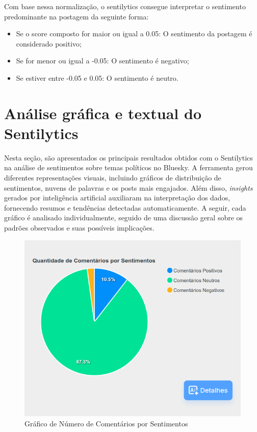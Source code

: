 \documentclass[
	12pt,				%
	oneside,			%
	a4paper,			%
	english,			%
	french,				%
	spanish,			%
	brazil				%
	]{abntex2}
\begin{document}
Com base nessa normalização, o sentilytics consegue interpretar o
sentimento predominante na postagem da seguinte forma:

\begin{itemize}
\tightlist
\item
  Se o score composto for maior ou igual a 0.05: O sentimento da
  postagem é considerado positivo;
\item
  Se for menor ou igual a -0.05: O sentimento é negativo;
\item
  Se estiver entre -0.05 e 0.05: O sentimento é neutro.
\end{itemize}

\hypertarget{anuxe1lise-gruxe1fica-e-textual-do-sentilytics}{%
\section{Análise gráfica e textual do
Sentilytics}\label{anuxe1lise-gruxe1fica-e-textual-do-sentilytics}}

Nesta seção, são apresentados os principais resultados obtidos com o
Sentilytics na análise de sentimentos sobre temas políticos no Bluesky.
A ferramenta gerou diferentes representações visuais, incluindo gráficos
de distribuição de sentimentos, nuvens de palavras e os posts mais
engajados. Além disso, \emph{insights} gerados por inteligência
artificial auxiliaram na interpretação dos dados, fornecendo resumos e
tendências detectadas automaticamente. A seguir, cada gráfico é
analisado individualmente, seguido de uma discussão geral sobre os
padrões observados e suas possíveis implicações.

\begin{figure}[htbp]
\hypertarget{grafico_numero_comentarios_por_sentimento}{%
\caption{Gráfico de Número de Comentários por Sentimentos}\label{grafico_numero_comentarios_por_sentimento}
\begin{center}
\includegraphics[scale=0.3]{imagens/sentilytics/estudo-caso/quantidade_comentarios_por_sentimentos.png}
\end{center}
}
\end{figure}
\end{document}
